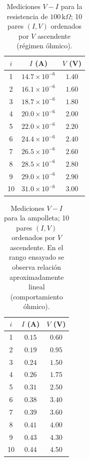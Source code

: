 \documentclass[11pt,twocolumn]{article}
\begin{document}

\begin{table}
\centering
\caption{Mediciones $V\!-\!I$ para la resistencia de $100\,\mathrm{k}\Omega$; 10 pares $(I,V)$ ordenados por $V$ ascendente (régimen óhmico).}

\label{tab1:resistencia}
\begin{tabular}{|c|c|c|}
\hline
$i$ & $I$ (A) & $V$ (V) \\
\hline
1  & $14.7\times 10^{-6}$ & $1.40$ \\
2  & $16.1\times 10^{-6}$ & $1.60$ \\
3  & $18.7\times 10^{-6}$ & $1.80$ \\
4  & $20.0\times 10^{-6}$ & $2.00$ \\
5  & $22.0\times 10^{-6}$ & $2.20$ \\
6  & $24.4\times 10^{-6}$ & $2.40$ \\
7  & $26.5\times 10^{-6}$ & $2.60$ \\
8  & $28.5\times 10^{-6}$ & $2.80$ \\
9  & $29.0\times 10^{-6}$ & $2.90$ \\
10 & $31.0\times 10^{-6}$ & $3.00$ \\
\hline
\end{tabular}
\end{table}


\begin{table}
\centering
\caption{Mediciones $V\!-\!I$ para la ampolleta; 10 pares $(I,V)$ ordenados por $V$ ascendente. En el rango ensayado se observa relación aproximadamente lineal (comportamiento óhmico).}
\label{tab1:ampolleta}
\begin{tabular}{|c|c|c|}
\hline
$i$ & $I$ (A) & $V$ (V) \\
\hline
1  & $0.15$ & $0.60$ \\
2  & $0.19$ & $0.95$ \\
3  & $0.24$ & $1.50$ \\
4  & $0.26$ & $1.75$ \\
5  & $0.31$ & $2.50$ \\
6  & $0.38$ & $3.40$ \\
7  & $0.39$ & $3.60$ \\
8  & $0.41$ & $4.00$ \\
9  & $0.43$ & $4.30$ \\
10 & $0.44$ & $4.50$ \\
\hline
\end{tabular}
\end{table}
\end{document}
